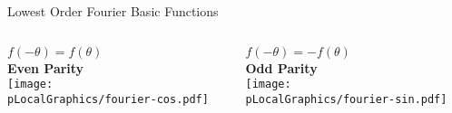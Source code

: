 \begin{frame}{Lowest Order Fourier Basic Functions}
    \centering
    \begin{columns}[c] %
        \begin{column}{0.5\textwidth}
            \centering
            $f(-\theta) = f(\theta)$  \\[0.5em]
            \textbf{Even Parity} \\[0.5em]
            \texttt{[image: \\pLocalGraphics/fourier-cos.pdf]}
        \end{column}

        \begin{column}{0.5\textwidth}
            \centering
            $f(-\theta) = -f(\theta)$  \\[0.5em]
            \textbf{Odd Parity} \\[0.5em]
            \texttt{[image: \\pLocalGraphics/fourier-sin.pdf]}
        \end{column}
    \end{columns}
\end{frame}


